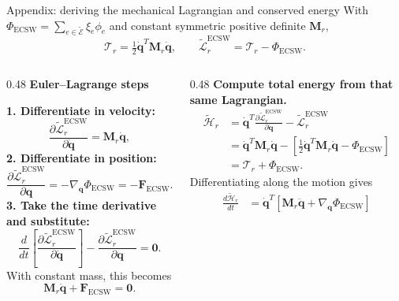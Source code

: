 \documentclass[aspectratio=169]{beamer}
\newcommand{\vect}[1]{\boldsymbol{#1}}
\newcommand{\matr}[1]{\boldsymbol{#1}}
\begin{document}
\begin{frame}{Appendix: deriving the mechanical Lagrangian and conserved energy}
\hypertarget{bmecsw-mechanical-derivation}{}
\fontsize{9}{10.5}\selectfont
\setlength{\parskip}{0pt}
\setlength{\abovedisplayskip}{1pt}
\setlength{\belowdisplayskip}{1pt}
\setlength{\abovedisplayshortskip}{1pt}
\setlength{\belowdisplayshortskip}{1pt}
With $\Phi_{\mathrm{ECSW}}=\sum_{e\in\widetilde{\mathcal E}}\xi_e\phi_e$ and constant symmetric positive definite $\matr{M}_r$,
\[
  \mathcal T_r=\tfrac12\dot{\vect{q}}^T\matr{M}_r\dot{\vect{q}},
  \qquad \widetilde{\mathcal L}_r^{\mathrm{ECSW}}=\mathcal T_r-\Phi_{\mathrm{ECSW}}.
\]
\vspace{3pt}
\begin{columns}[T,onlytextwidth]
\begin{column}{0.48\textwidth}
\textbf{Euler--Lagrange steps}\par
{\fontsize{8}{9}\selectfont\textbf{1. Differentiate in velocity:}}
\[
  \frac{\partial\widetilde{\mathcal L}_r^{\mathrm{ECSW}}}{\partial\dot{\vect{q}}}
  =\matr{M}_r\dot{\vect{q}},
\]
{\fontsize{8}{9}\selectfont\textbf{2. Differentiate in position:}}
\[
  \frac{\partial\widetilde{\mathcal L}_r^{\mathrm{ECSW}}}{\partial\vect{q}}
  =-\nabla_{\vect{q}}\Phi_{\mathrm{ECSW}}=-\vect{F}_{\mathrm{ECSW}}.
\]
{\fontsize{8}{9}\selectfont\textbf{3. Take the time derivative and substitute:}}
\[
  \frac{d}{dt}\left[\frac{\partial\widetilde{\mathcal L}_r^{\mathrm{ECSW}}}{\partial\dot{\vect{q}}}\right]
  -\frac{\partial\widetilde{\mathcal L}_r^{\mathrm{ECSW}}}{\partial\vect{q}}=\vect{0}.
\]
With constant mass, this becomes
\[
  \matr{M}_r\ddot{\vect{q}}+\vect{F}_{\mathrm{ECSW}}=\vect{0}.
\]
\end{column}
\begin{column}{0.48\textwidth}
\textbf{Compute total energy from that same Lagrangian.}
\[
\begin{aligned}
  \widetilde{\mathcal H}_r
  &=\dot{\vect{q}}^T\frac{\partial\widetilde{\mathcal L}_r^{\mathrm{ECSW}}}{\partial\dot{\vect{q}}}
    -\widetilde{\mathcal L}_r^{\mathrm{ECSW}}\\
  &=\dot{\vect{q}}^T\matr{M}_r\dot{\vect{q}}
    -[\tfrac12\dot{\vect{q}}^T\matr{M}_r\dot{\vect{q}}-\Phi_{\mathrm{ECSW}}]\\
  &=\mathcal T_r+\Phi_{\mathrm{ECSW}}.
\end{aligned}
\]
Differentiating along the motion gives
\[
\begin{aligned}
  \frac{d\widetilde{\mathcal H}_r}{dt}
  &=\dot{\vect{q}}^T[\matr{M}_r\ddot{\vect{q}}+\nabla_{\vect{q}}\Phi_{\mathrm{ECSW}}]\\

\end{aligned}\]
\end{column}
\end{columns}
\end{frame}
\end{document}
